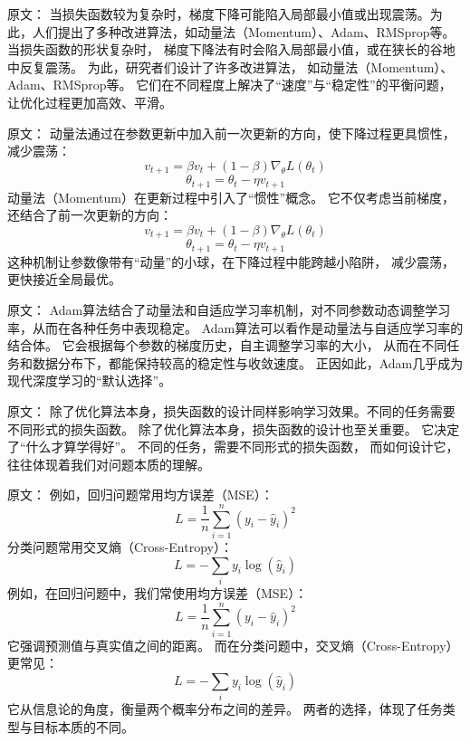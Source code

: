原文：
当损失函数较为复杂时，梯度下降可能陷入局部最小值或出现震荡。为此，人们提出了多种改进算法，如动量法（Momentum）、Adam、RMSprop等。
当损失函数的形状复杂时，  
梯度下降法有时会陷入局部最小值，或在狭长的谷地中反复震荡。  
为此，研究者们设计了许多改进算法，  
如动量法（Momentum）、Adam、RMSprop等。  
它们在不同程度上解决了“速度”与“稳定性”的平衡问题，  
让优化过程更加高效、平滑。



原文：
动量法通过在参数更新中加入前一次更新的方向，使下降过程更具惯性，减少震荡：
$$
v_{t+1} = \beta v_t + (1 - \beta) \nabla_\theta L(\theta_t)
$$
$$
\theta_{t+1} = \theta_t - \eta v_{t+1}
$$
动量法（Momentum）在更新过程中引入了“惯性”概念。  
它不仅考虑当前梯度，还结合了前一次更新的方向：  
$$
v_{t+1} = \beta v_t + (1 - \beta) \nabla_\theta L(\theta_t)
$$  
$$
\theta_{t+1} = \theta_t - \eta v_{t+1}
$$  
这种机制让参数像带有“动量”的小球，在下降过程中能跨越小陷阱，  
减少震荡，更快接近全局最优。



原文：
Adam算法结合了动量法和自适应学习率机制，对不同参数动态调整学习率，从而在各种任务中表现稳定。
Adam算法可以看作是动量法与自适应学习率的结合体。  
它会根据每个参数的梯度历史，自主调整学习率的大小，  
从而在不同任务和数据分布下，都能保持较高的稳定性与收敛速度。  
正因如此，Adam几乎成为现代深度学习的“默认选择”。



原文：
除了优化算法本身，损失函数的设计同样影响学习效果。不同的任务需要不同形式的损失函数。
除了优化算法本身，损失函数的设计也至关重要。  
它决定了“什么才算学得好”。  
不同的任务，需要不同形式的损失函数，  
而如何设计它，往往体现着我们对问题本质的理解。



原文：
例如，回归问题常用均方误差（MSE）：
$$
L = \frac{1}{n}\sum_{i=1}^{n}(y_i - \hat{y}_i)^2
$$
分类问题常用交叉熵（Cross-Entropy）：
$$
L = -\sum_{i} y_i \log(\hat{y}_i)
$$
例如，在回归问题中，我们常使用均方误差（MSE）：
$$
L = \frac{1}{n}\sum_{i=1}^{n}(y_i - \hat{y}_i)^2
$$  
它强调预测值与真实值之间的距离。  
而在分类问题中，交叉熵（Cross-Entropy）更常见：
$$
L = -\sum_{i} y_i \log(\hat{y}_i)
$$  
它从信息论的角度，衡量两个概率分布之间的差异。  
两者的选择，体现了任务类型与目标本质的不同。



